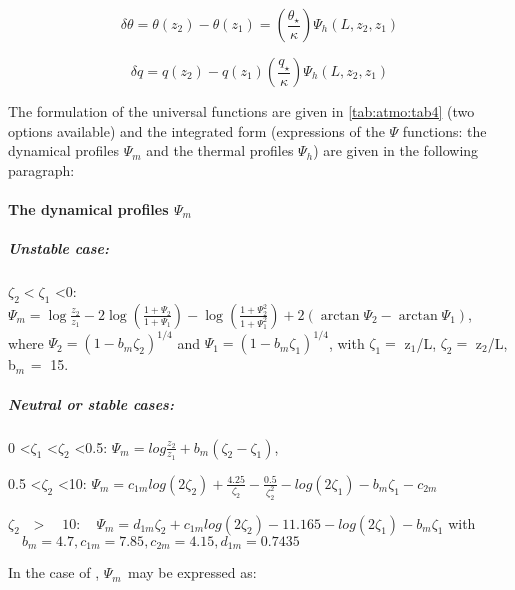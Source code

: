 \begin{equation}
\label{eq:atmo:eq10}
\delta \theta=\theta (z_2) -\theta (z_1)=
\left(\frac{\theta_{\star}}{\kappa} \right)\Psi_{h}\left({L,z_2,z_1} \right)
\end{equation}

\begin{equation}
\label{eq:atmo:eq11}
\delta q=q(z_2)-q(z_1)
\left( {\frac{q_{\star}}{\kappa}} \right)\Psi_{h} \left({L,z_2,z_1} \right)
\end{equation}

The formulation of the universal functions are given in \tablename{} \ref{tab:atmo:tab4} (two
options available) and the integrated form (expressions of the $\Psi$ functions:
the dynamical profiles $\Psi_{m}$ and the thermal profiles $\Psi_{h}$) are given in the following paragraph:

\paragraph{The dynamical profiles $\Psi_{m}$}

\subparagraph{Unstable case:}

$\zeta_{2}< \zeta_{1}$ \textless 0:
$\Psi_{m} =\log \frac{z_{2}}{z_{1}}-2\log \left({\frac{1+\Psi_{2} }{1+\Psi_{1} }}\right)-\log
\left( {\frac{1+\Psi_{2}^{2} }{1+\Psi_{1}^{2} }} \right)+2\left( {\arctan
\Psi_{2} -\arctan \Psi_{1} } \right)$,
\newline
where $\Psi_{2}= (1-b_{m} \zeta_{2})^{1/4}$ and $\Psi_{1} =(1-b_{m} \zeta_{1})^{1/4}$,
\newline
with $\zeta_{1}= $ z$_{1}$/L, $\zeta_{2}= $ z$_{2}$/L, b$_{m\, }= $ 15.

\subparagraph{Neutral or stable cases:}

0 \textless $\zeta_{1}$ \textless $\zeta_{2}$ \textless 0.5:
$\Psi_{m} =log\frac{z_{2} }{z_{1} }+b_{m} \left( {\zeta_{2} -\zeta_{1} } \right)$,

0.5 \textless $\zeta_{2}$ \textless 10:
$\Psi_{m} =c_{1m} log(2\zeta_{2})+\frac{4.25}{\zeta_{2}}-\frac{0.5}{\zeta_{2}^{2}}-log(2\zeta_{1} )-b_{m} \zeta_{1} -c_{2m} $

$\zeta_{2\quad }>\quad 10:
\quad
\Psi_{m} =d_{1m} \zeta_{2}
+c_{1m} log\left( {2\zeta_{2} }
\right)-\mbox{11.165}-log(2\zeta_{1}
)-b_{m} \zeta_{1}
$
\newline
with $\quad b_{m} = 4.7, c_{1m} = 7.85, c_{2m} = 4.15, d_{1m} = 0.7435$

In the case of \cite{Cheng:2005}, $\Psi_{m\, }$ may be expressed as:

